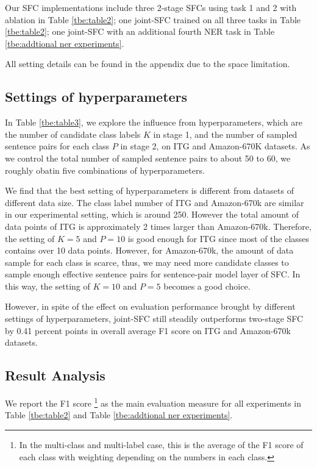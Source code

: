 Our SFC implementations include three 2-stage SFCs using task 1 and 2 with ablation in Table \ref{tbe:table2}; one joint-SFC trained on all three tasks in Table \ref{tbe:table2}; one joint-SFC with an additional fourth NER task in Table \ref{tbe:addtional ner experiments}. 

All setting details can be found in the appendix due to the space limitation.

\subsection{Settings  of  hyperparameters} 
In  Table \ref{tbe:table3}, we explore the influence from hyperparameters, which
are  the  number  of  candidate  class  labels $K$ in stage 1, and the number of
sampled  sentence  pairs  for  each class $P$ in stage 2, on ITG and Amazon-670K
datasets.  As we control the total number of sampled sentence pairs to about 50 to 60, we
roughly obatin five combinations of hyperparameters.  

We find  that the best setting of hyperparameters is different from datasets
of  different  data  size.  The  class label number of ITG and Amazon-670k are
similar  in  our  experimental setting, which is around 250. However the total
amount of data points of ITG is approximately 2 times larger than Amazon-670k.
Therefore,  the  setting of $K=5$ and $P=10$ is good enough for ITG since most
of  the  classes  contains  over 10 data points. However, for Amazon-670k, the
amount  of  data  sample  for  each  class  is  scarce, thus, we may need more
candidate  classes to sample enough effective sentence pairs for sentence-pair
model  layer  of  SFC.  In this way, the setting of $K=10$ and $P=5$ becomes a
good choice. 

However,  in  spite of the effect on evaluation performance brought by different
settings  of hyperparameters, joint-SFC still steadily outperforms two-stage SFC
by  0.41  percent  points  in  overall  average  F1 score on ITG and Amazon-670k
datasets.

\subsection{Result Analysis}
We report the F1 score \footnote{In the multi-class and multi-label case, this
is the average of the F1 score of each class with weighting depending on the
numbers in each class.} as the main evaluation measure for all experiments in
Table \ref{tbe:table2} and Table \ref{tbe:addtional ner experiments}.

